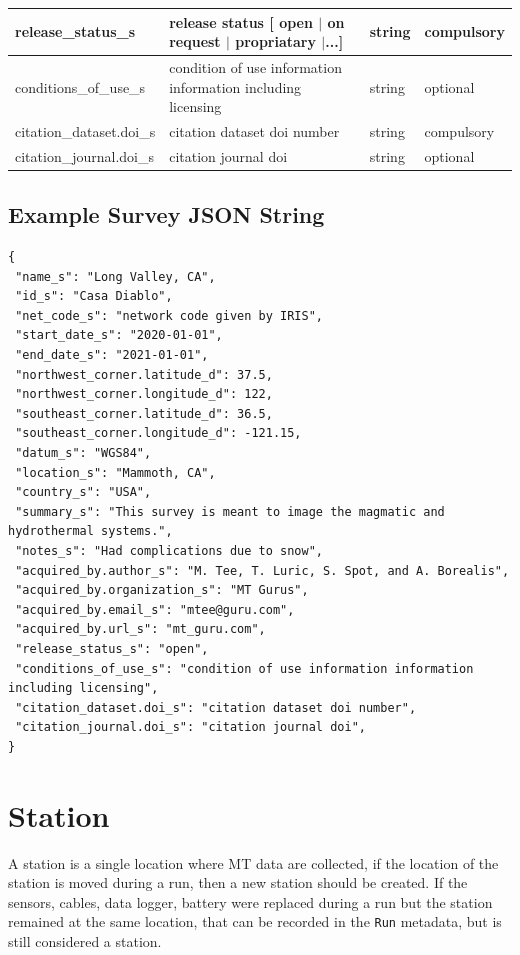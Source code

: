 \documentclass{article}
\begin{document}
\begin{table}[htb!]
\begin{tabular}{|l|l|l|l|}
		release\_status\_s & release status [ open $|$ on request $|$ propriatary $|$...] & string & compulsory \\ \hline
		conditions\_of\_use\_s & condition of use information information including licensing & string & optional \\ \hline
		citation\_dataset.doi\_s & citation dataset doi number & string & compulsory \\ \hline
		citation\_journal.doi\_s & citation journal doi & string & optional \\ \hline
	\end{tabular}
	\label{tab:survey}
\end{table} 

\newpage
\subsection{Example Survey JSON String}

\begin{verbatim}
{
 "name_s": "Long Valley, CA",
 "id_s": "Casa Diablo",
 "net_code_s": "network code given by IRIS",
 "start_date_s": "2020-01-01",
 "end_date_s": "2021-01-01",
 "northwest_corner.latitude_d": 37.5,
 "northwest_corner.longitude_d": 122,
 "southeast_corner.latitude_d": 36.5,
 "southeast_corner.longitude_d": -121.15,
 "datum_s": "WGS84",
 "location_s": "Mammoth, CA",
 "country_s": "USA",
 "summary_s": "This survey is meant to image the magmatic and hydrothermal systems.",
 "notes_s": "Had complications due to snow",
 "acquired_by.author_s": "M. Tee, T. Luric, S. Spot, and A. Borealis",
 "acquired_by.organization_s": "MT Gurus",
 "acquired_by.email_s": "mtee@guru.com",
 "acquired_by.url_s": "mt_guru.com",
 "release_status_s": "open",
 "conditions_of_use_s": "condition of use information information including licensing",
 "citation_dataset.doi_s": "citation dataset doi number",
 "citation_journal.doi_s": "citation journal doi",
}
\end{verbatim}

\newpage
\section{Station}

A station is a single location where MT data are collected, if the location of the station is moved during a run, then a new station should be created. If the sensors, cables, data logger, battery were replaced during a run but the station remained at the same location, that can be recorded in the \verb|Run| metadata, but is still considered a station.
\end{document}

